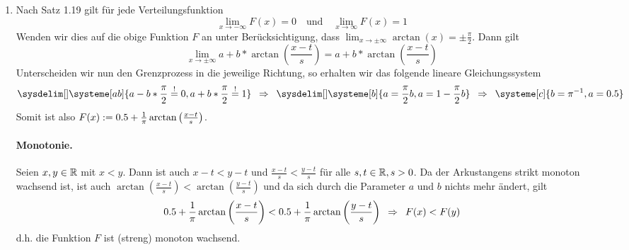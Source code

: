 \begin{exercisePage}
    \begin{enumerate}[leftmargin=*, label=(\alph*)]
        \item Nach Satz 1.19 gilt für jede Verteilungsfunktion
        \begin{equation*}
        \lim_{x \to -\infty} F(x) = 0 \quad \text{und} \quad \lim_{x \to \infty} F(x) = 1
        \end{equation*}
        Wenden wir dies auf die obige Funktion $F$ an unter Berücksichtigung, dass $\lim_{x \to \pm \infty} \arctan(x) = \pm \frac{\pi}{2}$. Dann gilt
        \begin{equation*}
        \lim_{x \to \pm \infty} a + b* \arctan \left(\frac{x-t}{s} \right) = a + b * \arctan \left(\frac{x-t}{s} \right)
        \end{equation*}
        Unterscheiden wir nun den Grenzprozess in die jeweilige Richtung, so erhalten wir das folgende lineare Gleichungssystem
        \begin{equation*}
        \sysdelim[]
        \systeme[ab]{a - b * \frac{\pi}{2} \overset{!}{=} 0 , a + b * \frac{\pi}{2} \overset{!}{=} 1} 
        \follows \sysdelim[]\systeme[b]{a = \frac{\pi}{2} b , a = 1 - \frac{\pi}{2} b} 
        \follows \systeme[c]{b = \pi^{-1} , a = 0.5}
        \end{equation*}
        Somit ist also $F(x) \mathrel{:=} 0.5 + \frac{1}{\pi} \arctan \left( \frac{x-t}{s} \right)$. 
        
        \paragraph{Monotonie.} Seien $x,y \in \mathbb{R}$ mit $x < y$. Dann ist auch $x -t < y - t$ und $\frac{x-t}{s} < \frac{y-t}{s}$ für alle $s,t \in \mathbb{R}, s > 0$. Da der Arkustangens strikt monoton wachsend ist, ist auch $\arctan \left( \frac{x-t}{s} \right) < \arctan \left( \frac{y-t}{s} \right)$ und da sich durch die Parameter $a$ und $b$ nichts mehr ändert, gilt
        \begin{equation*}
        0.5 + \frac{1}{\pi} \arctan \left( \frac{x-t}{s} \right) < 0.5 + \frac{1}{\pi} \arctan \left( \frac{y-t}{s} \right) \enskip \Rightarrow \enskip F(x) < F(y)
        \end{equation*}
        d.h. die Funktion $F$ ist (streng) monoton wachsend.
        

\end{enumerate}
\end{exercisePage}
